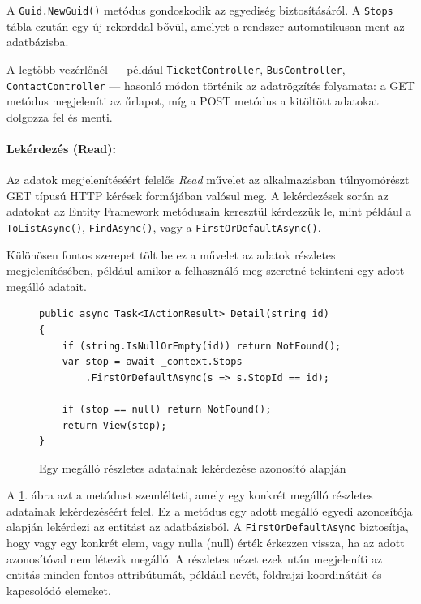 A \texttt{Guid.NewGuid()} metódus gondoskodik az egyediség biztosításáról. A \texttt{Stops} tábla ezután egy új rekorddal bővül, amelyet a rendszer automatikusan ment az adatbázisba.

A legtöbb vezérlőnél — például \texttt{TicketController}, \texttt{BusController}, \texttt{ContactController} — hasonló módon történik az adatrögzítés folyamata: a GET metódus megjeleníti az űrlapot, míg a POST metódus a kitöltött adatokat dolgozza fel és menti.


\paragraph{Lekérdezés (Read):}
Az adatok megjelenítéséért felelős \textit{Read} művelet az alkalmazásban túlnyomórészt GET típusú HTTP kérések formájában valósul meg. A lekérdezések során az adatokat az Entity Framework metódusain keresztül kérdezzük le, mint például a \texttt{ToListAsync()}, \texttt{FindAsync()}, vagy a \texttt{FirstOrDefaultAsync()}.

Különösen fontos szerepet tölt be ez a művelet az adatok részletes megjelenítésében, például amikor a felhasználó meg szeretné tekinteni egy adott megálló adatait.

\begin{figure}[H]
\caption{Egy megálló részletes adatainak lekérdezése azonosító alapján}
\label{fig:detail-stop-method}
\begin{minipage}{\textwidth}
\begin{BVerbatim}
public async Task<IActionResult> Detail(string id)
{
    if (string.IsNullOrEmpty(id)) return NotFound();
    var stop = await _context.Stops
        .FirstOrDefaultAsync(s => s.StopId == id);

    if (stop == null) return NotFound();
    return View(stop);
}
\end{BVerbatim}
\end{minipage}
\end{figure}

A \ref{fig:detail-stop-method}. ábra azt a metódust szemlélteti, amely egy konkrét megálló részletes adatainak lekérdezéséért felel. Ez a metódus egy adott megálló egyedi azonosítója alapján lekérdezi az entitást az adatbázisból. A \texttt{FirstOrDefaultAsync} biztosítja, hogy vagy egy konkrét elem, vagy nulla (null) érték érkezzen vissza, ha az adott azonosítóval nem létezik megálló. A részletes nézet ezek után megjeleníti az entitás minden fontos attribútumát, például nevét, földrajzi koordinátáit és kapcsolódó elemeket.


